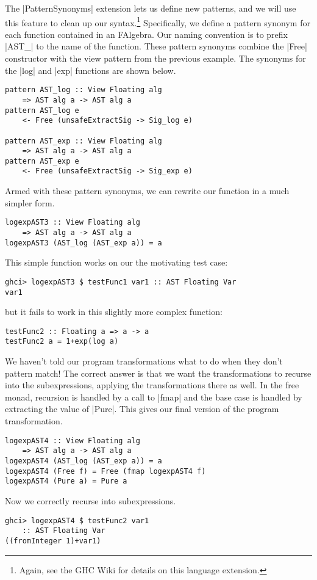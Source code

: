 \documentclass[preprint]{sigplanconf}
\theoremstyle{definition}
\begin{document}
The |PatternSynonyms| extension lets us define new patterns,
and we will use this feature to clean up our syntax.\footnote{
    Again, see the GHC Wiki \cite{patternsynonyms} for details on this language extension.
}
Specifically, we define a pattern synonym for each function contained in an FAlgebra.
Our naming convention is to prefix |AST_| to the name of the function.
These pattern synonyms combine the |Free| constructor with the view pattern from the previous example.
The synonyms for the |log| and |exp| functions are shown below.
\begin{lstlisting}
pattern AST_log :: View Floating alg
    => AST alg a -> AST alg a
pattern AST_log e
    <- Free (unsafeExtractSig -> Sig_log e)

pattern AST_exp :: View Floating alg
    => AST alg a -> AST alg a
pattern AST_exp e
    <- Free (unsafeExtractSig -> Sig_exp e)
\end{lstlisting}
Armed with these pattern synonyms,
we can rewrite our function in a much simpler form.
\begin{lstlisting}
logexpAST3 :: View Floating alg
    => AST alg a -> AST alg a
logexpAST3 (AST_log (AST_exp a)) = a
\end{lstlisting}
This simple function works on our the motivating test case:
\begin{lstlisting}
ghci> logexpAST3 $ testFunc1 var1 :: AST Floating Var
var1
\end{lstlisting}
but it fails to work in this slightly more complex function:
\begin{lstlisting}
testFunc2 :: Floating a => a -> a
testFunc2 a = 1+exp(log a)
\end{lstlisting}
We haven't told our program transformations what to do when they don't pattern match!
The correct answer is that we want the transformations to recurse into the subexpressions,
applying the transformations there as well.
In the free monad, recursion is handled by a call to |fmap| and the base case is handled by extracting the value of |Pure|.
This gives our final version of the program transformation.
\begin{lstlisting}
logexpAST4 :: View Floating alg
    => AST alg a -> AST alg a
logexpAST4 (AST_log (AST_exp a)) = a
logexpAST4 (Free f) = Free (fmap logexpAST4 f)
logexpAST4 (Pure a) = Pure a
\end{lstlisting}
Now we correctly recurse into subexpressions.
\begin{lstlisting}
ghci> logexpAST4 $ testFunc2 var1
    :: AST Floating Var
((fromInteger 1)+var1)
\end{lstlisting}
\end{document}
